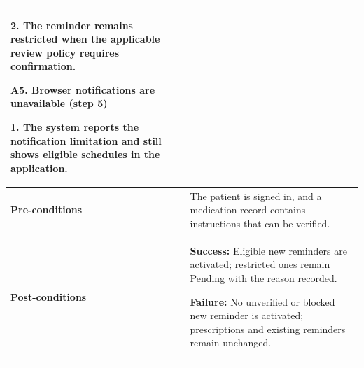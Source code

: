 \begin{longtable}{|p{}|p{}|}
2. The reminder remains restricted when the applicable review policy requires confirmation.
\par\smallskip
\textbf{A5. Browser notifications are unavailable (step 5)}\par
1. The system reports the notification limitation and still shows eligible schedules in the application.
\\ \hline
\textbf{Pre-conditions} & The patient is signed in, and a medication record contains instructions that can be verified. \\ \hline
\textbf{Post-conditions} & \textbf{Success:} Eligible new reminders are activated; restricted ones remain Pending with the reason recorded.\par
\textbf{Failure:} No unverified or blocked new reminder is activated; prescriptions and existing reminders remain unchanged. \\ \hline
\end{longtable}

\clearpage
